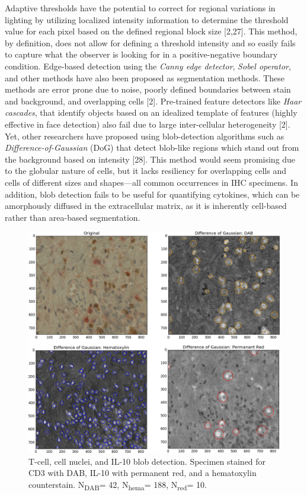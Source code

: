 \documentclass[12pt]{article}
\begin{document}
Adaptive thresholds have the potential to correct for regional variations in lighting by utilizing localized intensity information to determine the threshold value for each pixel based on the defined regional block size [2,27]. This method, by definition, does not allow for defining a threshold intensity and so easily fails to capture what the observer is looking for in a positive-negative boundary condition. Edge-based detection using the \textit{Canny edge detector}, \textit{Sobel operator}, and other methods have also been proposed as segmentation methods. These methods are error prone due to noise, poorly defined boundaries between stain and background, and overlapping cells [2]. Pre-trained feature detectors like \textit{Haar cascades}, that identify objects based on an idealized template of features (highly effective in face detection) also fail due to large inter-cellular heterogeneity [2]. Yet, other researchers have proposed using blob-detection algorithms such as \textit{Difference-of-Gaussian} (DoG) that detect blob-like regions which stand out from the background based on intensity [28]. This method would seem promising due to the globular nature of cells, but it lacks resiliency for overlapping cells and cells of different sizes and shapes---all common occurrences in IHC specimens. In addition, blob detection fails to be useful for quantifying cytokines, which can be amorphously diffused in the extracellular matrix, as it is inherently cell-based rather than area-based segmentation.

\begin{figure}[H]
  \includegraphics[width=\linewidth]{3BlobDetect.png}
  \caption{T-cell, cell nuclei, and IL-10 blob detection. Specimen stained for CD3 with DAB, IL-10 with permanent red, and a hematoxylin counterstain. N\textsubscript{DAB}= 42, N\textsubscript{hema}= 188, N\textsubscript{red}= 10.}
  \label{fig:BlobDetect3}
\end{figure}
\end{document}
